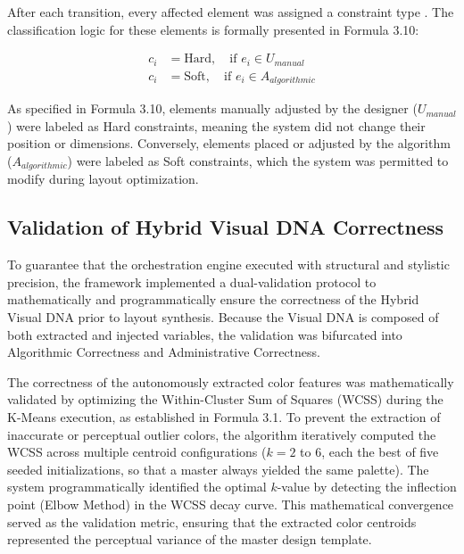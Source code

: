 \begin{refsection}
After each transition, every affected element was assigned a constraint type \cite{Liu2026Multimedia}. The classification logic for these elements is formally presented in Formula 3.10:

\begin{center}
\begin{minipage}{0.8\textwidth}
\begin{equation}
\begin{aligned}
c_i &= \text{Hard}, \quad \text{if } e_i \in U_{manual} \\
c_i &= \text{Soft}, \quad \text{if } e_i \in A_{algorithmic}
\end{aligned}
\end{equation}
\centering
\end{minipage}
\end{center}

As specified in Formula 3.10, elements manually adjusted by the designer ($U_{manual}$) were labeled as Hard constraints, meaning the system did not change their position or dimensions. Conversely, elements placed or adjusted by the algorithm ($A_{algorithmic}$) were labeled as Soft constraints, which the system was permitted to modify during layout optimization. 

\subsection{Validation of Hybrid Visual DNA Correctness}
To guarantee that the orchestration engine executed with structural and stylistic precision, the framework implemented a dual-validation protocol to mathematically and programmatically ensure the correctness of the Hybrid Visual DNA prior to layout synthesis. Because the Visual DNA is composed of both extracted and injected variables, the validation was bifurcated into Algorithmic Correctness and Administrative Correctness.

The correctness of the autonomously extracted color features was mathematically validated by optimizing the Within-Cluster Sum of Squares (WCSS) during the K-Means execution, as established in Formula 3.1. To prevent the extraction of inaccurate or perceptual outlier colors, the algorithm iteratively computed the WCSS across multiple centroid configurations ($k = 2$ to $6$, each the best of five seeded initializations, so that a master always yielded the same palette). The system programmatically identified the optimal $k$-value by detecting the inflection point (Elbow Method) in the WCSS decay curve. This mathematical convergence served as the validation metric, ensuring that the extracted color centroids represented the perceptual variance of the master design template.


\end{refsection}
